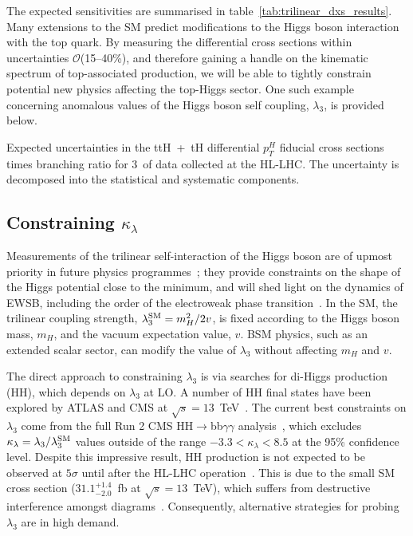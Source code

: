 The expected sensitivities are summarised in table~\ref{tab:trilinear_dxs_results}. Many extensions to the SM predict modifications to the Higgs boson interaction with the top quark. By measuring the differential cross sections within uncertainties $\mathcal{O}$(15--40\%), and therefore gaining a handle on the kinematic spectrum of top-associated production, we will be able to tightly constrain potential new physics affecting the top-Higgs sector. One such example concerning anomalous values of the Higgs boson self coupling, $\lambda_3$, is provided below.

\begin{table}[htb!]
  \centering
  \renewcommand{\arraystretch}{1.8}
  \setlength{\tabcolsep}{15pt}
  \caption[Expected sensitivities of top-associated differential cross sections at the HL-LHC]
  {
    Expected uncertainties in the ttH~+~tH differential $p_T^H$ fiducial cross sections times branching ratio for 3~\abinv of data collected at the HL-LHC. The uncertainty is decomposed into the statistical and systematic components.
  }
  \label{tab:trilinear_dxs_results}
  \hspace*{-1cm}
  
  \hspace*{-1cm}
\end{table}

\subsection{Constraining $\kappa_\lambda$}
Measurements of the trilinear self-interaction of the Higgs boson are of upmost priority in future physics programmes~\cite{Cepeda:2019klc}; they provide constraints on the shape of the Higgs potential close to the minimum, and will shed light on the dynamics of EWSB, including the order of the electroweak phase transition~\cite{PhysRevD.13.974,PhysRevD.20.2619,Kajantie:1995kf,Csikor:1998eu}. In the SM, the trilinear coupling strength, $\lambda^{\rm{SM}}_3=m_H^2/2v$, is fixed according to the Higgs boson mass, $m_H$, and the vacuum expectation value, $v$. BSM physics, such as an extended scalar sector, can modify the value of $\lambda_3$ without affecting $m_H$ and $v$.

The direct approach to constraining $\lambda_3$ is via searches for di-Higgs production (HH), which depends on $\lambda_3$ at LO. A number of HH final states have been explored by ATLAS and CMS at $\sqrt{s}=13$~TeV~\cite{Sirunyan:2018ayu,Aad:2019uzh}. The current best constraints on $\lambda_3$ come from the full Run 2 CMS HH$\rightarrow$bb$\gamma\gamma$ analysis~\cite{Sirunyan:2020xok}, which excludes $\kappa_\lambda=\lambda_3/\lambda_3^{\rm{SM}}$ values outside of the range $-3.3 < \kappa_\lambda < 8.5$ at the 95\% confidence level. Despite this impressive result, HH production is not expected to be observed at $5\sigma$ until after the HL-LHC operation~\cite{Cepeda:2019klc}. This is due to the small SM cross section ($31.1^{+1.4}_{-2.0}$~fb at $\sqrt{s}=13$~TeV), which suffers from destructive interference amongst diagrams~\cite{Grazzini:2018bsd}. Consequently, alternative strategies for probing $\lambda_3$ are in high demand.

